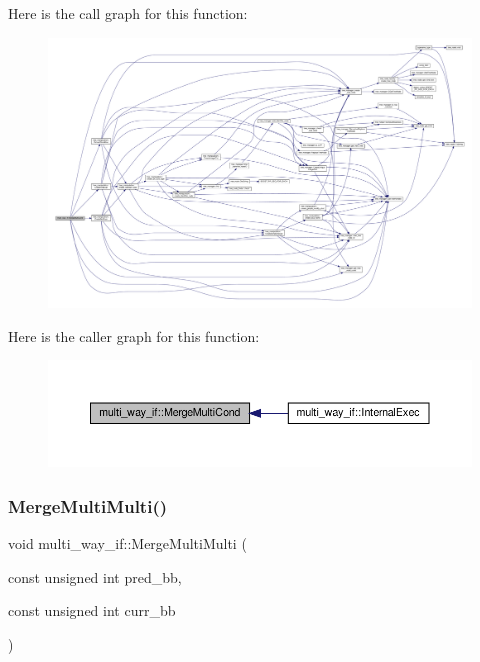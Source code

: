 Here is the call graph for this function\+:
\nopagebreak
\begin{figure}[H]
\begin{center}
\leavevmode
\includegraphics[width=350pt]{dd/dca/classmulti__way__if_a61400a9cda1ead68203f4fa34ca2a120_cgraph}
\end{center}
\end{figure}
Here is the caller graph for this function\+:
\nopagebreak
\begin{figure}[H]
\begin{center}
\leavevmode
\includegraphics[width=350pt]{dd/dca/classmulti__way__if_a61400a9cda1ead68203f4fa34ca2a120_icgraph}
\end{center}
\end{figure}
\mbox{\label{classmulti__way__if_a074fa69a22db0768c7e6b7f237ef38d7}} 
\subsubsection{\texorpdfstring{Merge\+Multi\+Multi()}{MergeMultiMulti()}}
{\footnotesize\ttfamily void multi\+\_\+way\+\_\+if\+::\+Merge\+Multi\+Multi (\begin{DoxyParamCaption}\item[{const unsigned int}]{pred\+\_\+bb,  }\item[{const unsigned int}]{curr\+\_\+bb }\end{DoxyParamCaption})\hspace{0.3cm}{\ttfamily [private]}}



